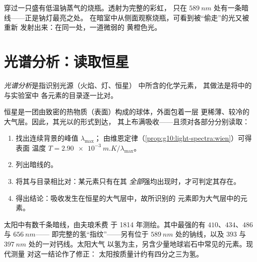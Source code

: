 \begin{example}[盛有钠蒸气的烧瓶]\label{ex:g10:light-spectra:sodiumflask}
穿过一只盛有低温钠蒸气的烧瓶。透射为完整的彩虹，
只在 $\qty{589}{nm}$ 处有一条暗线——正是钠灯最亮之处。
在暗室中从侧面观察烧瓶，可看到被“偷走”的光又被重新
发射出来：在同一处，一道微弱的
黄橙色光。
\end{example}

\section{光谱分析：读取恒星}

\begin{definition}[光谱分析]\label{def:g10:light-spectra:analysis}
\emph{光谱分析}是指识别光源（火焰、灯、恒星）
中所含的化学元素，
其做法是将中的与实验室中
各元素的目录逐一比对。
\end{definition}

\begin{method}[读取恒星光谱]\label{met:g10:light-spectra:reading}
恒星是一团由致密的热物质（表面）构成的球体，外面包着一层
更稀薄、较冷的大气层。因此，其光以的形式到达，
其上布满吸收——且须对各部分分别读取：
\begin{enumerate}
  \item 找出连续背景的峰值 $\lambda_{\max}$；
        由维恩定律（\cref{prop:g10:light-spectra:wien}）可得表面
        温度 $T = \qty{2.90e-3}{m.K} / \lambda_{\max}$。
  \item 列出暗线的。
  \item 将其与目录相比对：某元素只有在其
        \emph{全部}强均出现时，才可判定其存在。
  \item 得出结论：吸收发生在恒星的大气层中，故所识别的
        元素即为大气层中的元素。
\end{enumerate}
\end{method}

\begin{example}[太阳的“配方”]\label{ex:g10:light-spectra:sunrecipe}
太阳中有数千条暗线，由夫琅禾费
于 1814 年测绘。其中最强的有 $410$、$434$、$486$ 与 $\qty{656}{nm}$——
即完整的氢“指纹”——另有位于
$\qty{589}{nm}$ 处的钠线，以及 $393$ 与 $\qty{397}{nm}$ 处的一对钙线。太阳大气
以氢为主，另含少量地球岩石中常见的元素。现代测量
对这一结论作了修正：
太阳按质量计约有四分之三为氢。
\end{example}

